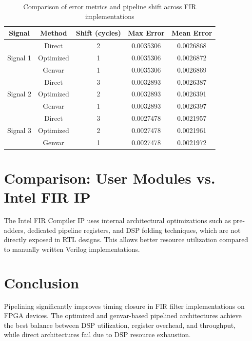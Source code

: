 \documentclass[11pt,a4paper]{article}
\begin{document}
\begin{table}[H]
\centering
\renewcommand{\arraystretch}{1.3}

\begin{tabular}{|c|c|c|c|c|}
\hline
\textbf{Signal} & \textbf{Method} & \textbf{Shift (cycles)} & \textbf{Max Error} & \textbf{Mean Error} \\
\hline

\multirow{3}{*}{Signal 1}
& Direct    & 2 & 0.0035306 & 0.0026868 \\
& Optimized & 1 & 0.0035306 & 0.0026872 \\
& Genvar    & 1 & 0.0035306 & 0.0026869 \\
\hline

\multirow{3}{*}{Signal 2}
& Direct    & 3 & 0.0032893 & 0.0026387 \\
& Optimized & 2 & 0.0032893 & 0.0026391 \\
& Genvar    & 1 & 0.0032893 & 0.0026397 \\
\hline

\multirow{3}{*}{Signal 3}
& Direct    & 3 & 0.0027478 & 0.0021957 \\
& Optimized & 2 & 0.0027478 & 0.0021961 \\
& Genvar    & 1 & 0.0027478 & 0.0021972 \\
\hline

\end{tabular}

\caption{Comparison of error metrics and pipeline shift across FIR implementations}
\end{table}

\section{Comparison: User Modules vs. Intel FIR IP}

The Intel FIR Compiler IP uses internal architectural optimizations such as pre-adders, dedicated pipeline registers, and DSP folding techniques, which are not directly exposed in RTL designs. This allows better resource utilization compared to manually written Verilog implementations.

\section{Conclusion}

Pipelining significantly improves timing closure in FIR filter implementations on FPGA devices. The optimized and genvar-based pipelined architectures achieve the best balance between DSP utilization, register overhead, and throughput, while direct architectures fail due to DSP resource exhaustion.
\end{document}
